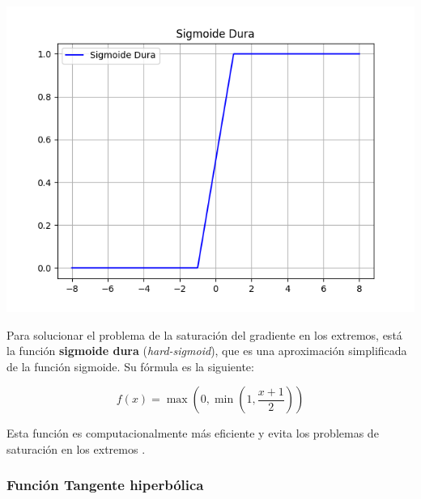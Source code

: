 \begin{minipage}{0.35\textwidth}
    \includegraphics[width=1.1\textwidth]{img/Sigmoide Dura.png}
    \label{img: sigmoideDura}
\end{minipage}
\begin{minipage}{0.05\textwidth}
\textbf{ }
\end{minipage}
\begin{minipage}{0.6\textwidth}
    Para solucionar el problema de la saturación del gradiente en los extremos, está la función \textbf{sigmoide dura} (\textit{hard-sigmoid}), que es una aproximación simplificada de la función sigmoide. Su fórmula es la siguiente:

\begin{equation}
    f(x) = \max(0, \min(1, \frac{x+1}{2}))
\end{equation}

Esta función es computacionalmente más eficiente y evita los problemas de saturación en los extremos \citep{pajares2021aprendizaje}.
\end{minipage}



\subsubsection*{Función Tangente hiperbólica}
 

